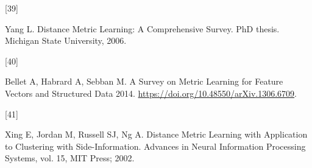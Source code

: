 \documentclass[preprint, 3p,
authoryear]{elsarticle} %
\newlength{\cslhangindent}
\newlength{\csllabelwidth}
\newlength{\cslentryspacingunit} %
\newenvironment{CSLReferences}[2] %
 {%
  \setlength{\parindent}{0pt}
  \ifodd #1
  \let\oldpar\par
  \def\par{\hangindent=\cslhangindent\oldpar}
  \fi
  \setlength{\parskip}{#2\cslentryspacingunit}
 }%
 {}
\newcommand{\CSLLeftMargin}[1]{\parbox[t]{\csllabelwidth}{#1}}
\newcommand{\CSLRightInline}[1]{\parbox[t]{\linewidth - \csllabelwidth}{#1}\break}
\begin{document}
\begin{CSLReferences}{0}{0}
\leavevmode{}%
\CSLLeftMargin{{[}39{]} }%
\CSLRightInline{Yang L. Distance {Metric Learning}: {A Comprehensive
Survey}. PhD thesis. Michigan State University, 2006.}

\leavevmode{}%
\CSLLeftMargin{{[}40{]} }%
\CSLRightInline{Bellet A, Habrard A, Sebban M. A {Survey} on {Metric
Learning} for {Feature Vectors} and {Structured Data} 2014.
\url{https://doi.org/10.48550/arXiv.1306.6709}.}

\leavevmode{}%
\CSLLeftMargin{{[}41{]} }%
\CSLRightInline{Xing E, Jordan M, Russell SJ, Ng A. Distance {Metric
Learning} with {Application} to {Clustering} with {Side-Information}.
Advances in {Neural Information Processing Systems}, vol. 15, {MIT
Press}; 2002.}

\end{CSLReferences}
\end{document}
